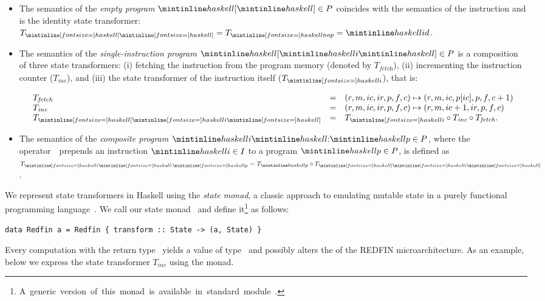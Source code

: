 \begin{itemize}
    \item The semantics of the \emph{empty program} $\hs{[}\hs{]} \in P$ coincides with
    the semantics of the instruction  and is the identity state transformer:
    $T_{\subhs{[}\subhs{]}} = T_{\subhs{nop}} = \hs{id}$.
    
    \item The semantics of the \emph{single-instruction program} $\hs{[}\hs{i}\hs{]} \in P$
    is a composition of three state transformers: (i) fetching the instruction from
    the program memory (denoted by $T_\textit{fetch}$), (ii) incrementing the
    instruction counter ($T_\textit{inc}$), and (iii) the state transformer
    of the instruction itself ($T_{\subhs{i}}$), that is:
    
    \[
    \begin{array}{lcl}
    T_\textit{fetch} & = & (r, m, ic, ir, p, f, c) \mapsto (r, m, ic, p[ic], p, f, c + 1)\\
    T_\textit{inc} & = & (r, m, ic, ir, p, f, c) \mapsto (r, m, ic + 1, ir, p, f, c)\\
    T_{\subhs{[}\subhs{i}\subhs{]}} & = & T_{\subhs{i}} \circ T_\textit{inc} \circ T_\textit{fetch}.\\
    \end{array}
    \]
    
    \item The semantics of the \emph{composite program} $\hs{i}\hs{:}\hs{p} \in P$,
    where the operator~\hs{:}~prepends an instruction $\hs{i} \in I$ to a program
    $\hs{p} \in P$, is defined as $T_{\subhs{i}\subhs{:}\subhs{p}} = T_{\hs{p}} \circ T_{\subhs{[}\subhs{i}\subhs{]}}$.
    
\end{itemize}

\noindent
We represent state transformers in Haskell using the \emph{state monad}, a
classic approach to emulating mutable state in a purely functional programming
language~\cite{wadler1990comprehending}. We call our state monad~ and
define it\footnote{\mbox{A generic version of this monad is available in standard module
.}} as follows:


\begin{verbatim}
data Redfin a = Redfin { transform :: State -> (a, State) }
\end{verbatim}


\noindent
Every computation with the return type~  yields a value of type~
and possibly alters the  of the REDFIN microarchitecture. As an example,
below we express the state transformer $T_\textit{inc}$ using the  monad.


